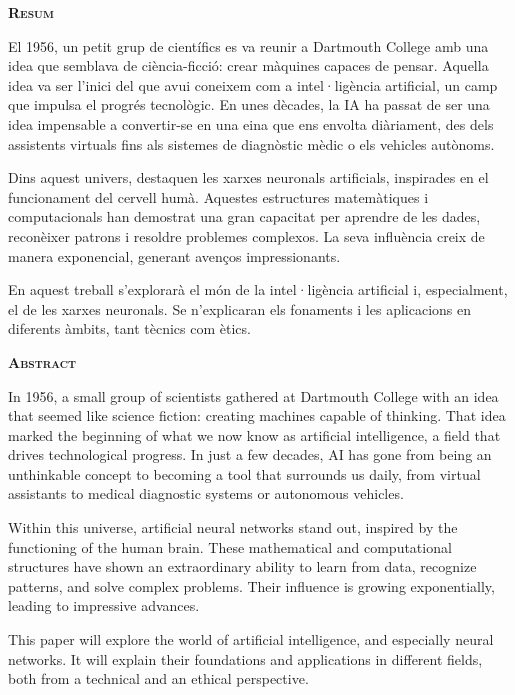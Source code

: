 
\setlength{\parskip}{4pt}

\begin{modernquote}
\textsc{\textbf{Resum}}\par
{}
\raggedright
El 1956, un petit grup de científics es va reunir a Dartmouth College amb una idea que semblava de ciència-ficció: crear màquines capaces de pensar. Aquella idea va ser l'inici del que avui coneixem com a intel·ligència artificial, un camp que impulsa el progrés tecnològic. En unes dècades, la IA ha passat de ser una idea impensable a convertir-se en una eina que ens envolta diàriament, des dels assistents virtuals fins als sistemes de diagnòstic mèdic o els vehicles autònoms.\par

Dins aquest univers, destaquen les xarxes neuronals artificials, inspirades en el funcionament del cervell humà. Aquestes estructures matemàtiques i computacionals han demostrat una gran capacitat per aprendre de les dades, reconèixer patrons i resoldre problemes complexos. La seva influència creix de manera exponencial, generant avenços impressionants.\par

En aquest treball s'explorarà el món de la intel·ligència artificial i, especialment, el de les xarxes neuronals. Se n'explicaran els fonaments i les aplicacions en diferents àmbits, tant tècnics com ètics.
\end{modernquote}

\bigskip

\begin{modernquote}
\textsc{\textbf{Abstract}}\par
{}
\raggedright
In 1956, a small group of scientists gathered at Dartmouth College with an idea that seemed like science fiction: creating machines capable of thinking. That idea marked the beginning of what we now know as artificial intelligence, a field that drives technological progress. In just a few decades, AI has gone from being an unthinkable concept to becoming a tool that surrounds us daily, from virtual assistants to medical diagnostic systems or autonomous vehicles.\par

Within this universe, artificial neural networks stand out, inspired by the functioning of the human brain. These mathematical and computational structures have shown an extraordinary ability to learn from data, recognize patterns, and solve complex problems. Their influence is growing exponentially, leading to impressive advances.\par

This paper will explore the world of artificial intelligence, and especially neural networks. It will explain their foundations and applications in different fields, both from a technical and an ethical perspective.
\end{modernquote}


